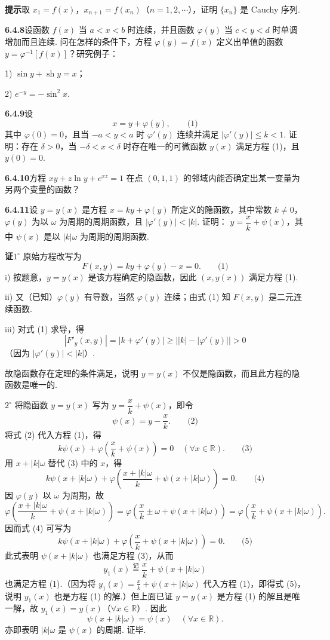 \documentclass[UTF8,12pt,a4paper,fontset=fandol]{ctexart}
\begin{document}
\noindent\textbf{提示}\quad 取 $x_1=f(x)$，$x_{n+1}=f(x_n)$（$n=1,2,\cdots$），证明 $\{x_n\}$ 是 Cauchy 序列.

\noindent\textbf{6.4.8}\quad 设函数 $f(x)$ 当 $a<x<b$ 时连续，并且函数 $\varphi(y)$ 当 $c<y<d$ 时单调增加而且连续. 问在怎样的条件下，方程 $\varphi(y)=f(x)$ 定义出单值的函数
$y=\varphi^{-1}[f(x)]$？研究例子：

1) $\sin y+\operatorname{sh} y=x$；

2) $e^{-y}=-\sin^2x$.

\noindent\textbf{6.4.9}\quad 设
\[
  x=y+\varphi(y), \qquad\text{(1)}
\]
其中 $\varphi(0)=0$，且当 $-a<y<a$ 时 $\varphi'(y)$ 连续并满足
$|\varphi'(y)|\le k<1$. 证明：存在 $\delta>0$，当 $-\delta<x<\delta$ 时存在唯一的可微函数 $y(x)$ 满足方程 (1)，且 $y(0)=0$.

\noindent\textbf{6.4.10}\quad 方程 $xy+z\ln y+e^{xz}=1$ 在点 $(0,1,1)$ 的邻域内能否确定出某一变量为另两个变量的函数？

\noindent\textbf{6.4.11}\quad 设 $y=y(x)$ 是方程 $x=ky+\varphi(y)$ 所定义的隐函数，其中常数 $k\ne0$，$\varphi(y)$ 为以 $\omega$ 为周期的周期函数，且 $|\varphi'(y)|<|k|$. 证明：
$y=\dfrac{x}{k}+\psi(x)$，其中 $\psi(x)$ 是以 $|k|\omega$ 为周期的周期函数.

\noindent\textbf{证}\quad $1^\circ$ 原始方程改写为
\[
  F(x,y)=ky+\varphi(y)-x=0. \qquad\text{(1)}
\]
i) 按题意，$y=y(x)$ 是该方程确定的隐函数，因此 $(x,y(x))$ 满足方程 (1).

ii) 又（已知）$\varphi(y)$ 有导数，当然 $\varphi(y)$ 连续；由式 (1) 知 $F(x,y)$ 是二元连续函数.

iii) 对式 (1) 求导，得
\[
  |F'_y(x,y)|=|k+\varphi'(y)|\ge \bigl||k|-|\varphi'(y)|\bigr|>0
\]
（因为 $|\varphi'(y)|<|k|$）.

故隐函数存在定理的条件满足，说明 $y=y(x)$ 不仅是隐函数，而且此方程的隐函数是唯一的.

$2^\circ$ 将隐函数 $y=y(x)$ 写为 $y=\dfrac{x}{k}+\psi(x)$，即令
\[
  \psi(x)=y-\frac{x}{k}. \qquad\text{(2)}
\]
将式 (2) 代入方程 (1)，得
\[
  k\psi(x)+\varphi\left(\frac{x}{k}+\psi(x)\right)=0\quad(\forall x\in\mathbb R). \qquad\text{(3)}
\]
用 $x+|k|\omega$ 替代 (3) 中的 $x$，得
\[
  k\psi(x+|k|\omega)
  +\varphi\left(\frac{x+|k|\omega}{k}+\psi(x+|k|\omega)\right)=0. \qquad\text{(4)}
\]
因 $\varphi(y)$ 以 $\omega$ 为周期，故
\[
  \varphi\left(\frac{x+|k|\omega}{k}+\psi(x+|k|\omega)\right)
  =
  \varphi\left(\frac{x}{k}\pm\omega+\psi(x+|k|\omega)\right)
  =
  \varphi\left(\frac{x}{k}+\psi(x+|k|\omega)\right).
\]
因而式 (4) 可写为
\[
  k\psi(x+|k|\omega)
  +\varphi\left(\frac{x}{k}+\psi(x+|k|\omega)\right)=0. \qquad\text{(5)}
\]
此式表明 $\psi(x+|k|\omega)$ 也满足方程 (3)，从而
\[
  y_1(x)\overset{\text{记}}{=}\frac{x}{k}+\psi(x+|k|\omega)
\]
也满足方程 (1).（因为将 $y_1(x)=\frac{x}{k}+\psi(x+|k|\omega)$ 代入方程 (1)，即得式 (5)，说明 $y_1(x)$ 也是方程 (1) 的解.）但上面已证 $y=y(x)$ 是方程 (1) 的解且是唯一解，故
$y_1(x)=y(x)$（$\forall x\in\mathbb R$）. 因此
\[
  \psi(x+|k|\omega)=\psi(x)\quad(\forall x\in\mathbb R).
\]
亦即表明 $|k|\omega$ 是 $\psi(x)$ 的周期. 证毕.
\end{document}
